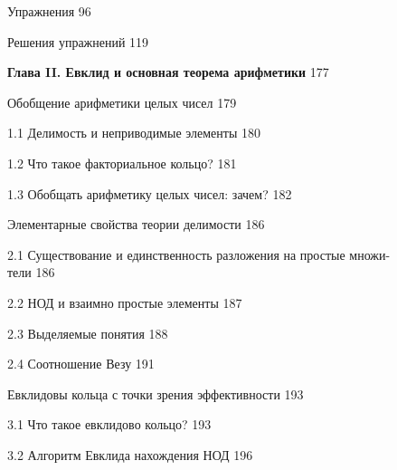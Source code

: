 \documentclass{mai_book}
\begin{document}
{\noindent  Упражнения \dotfill \hspace{0.5cm} 96
    
\noindent 
Решения упражнений \dotfill \hspace{0.5cm} 119
\newline

\noindent \textbf{Глава II. Евклид и основная теорема арифметики} \dotfill \hspace{0.5cm} 177 
    
 \hspace{0.05cm} Обобщение арифметики целых чисел \dotfill \hspace{0.5cm} 179
    
    1.1 Делимость и неприводимые элементы \dotfill \hspace{0.5cm} 180
    
    1.2 Что такое факториальное кольцо? \dotfill \hspace{0.5cm} 181
    
    1.3 Обобщать арифметику целых чисел: зачем? \dotfill \hspace{0.5cm}  182
    
 \hspace{0.05cm} Элементарные свойства теории делимости \dotfill \hspace{0.5cm} 186
    
    2.1 Существование и единственность разложения на простые множи- \\
    тели \dotfill \hspace{0.5cm} 186
    
    2.2 НОД и взаимно простые элементы \dotfill \hspace{0.5cm} 187
    
    2.3 Выделяемые понятия \dotfill \hspace{0.5cm} 188
    
    2.4 Соотношение Везу \dotfill \hspace{0.5cm} 191
    
 \hspace{0.05cm} Евклидовы кольца с точки зрения эффективности \dotfill \hspace{0.5cm} 193 
    
    3.1 Что такое евклидово кольцо? \dotfill \hspace{0.5cm} 193 
    
    3.2 Алгоритм Евклида нахождения НОД \dotfill \hspace{0.5cm} 196 
    
}
\end{document}
